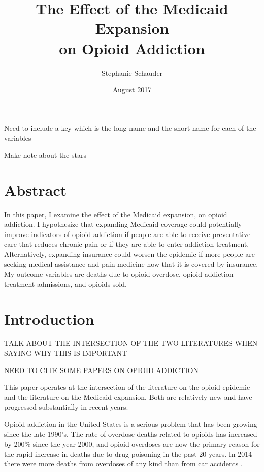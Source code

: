 \documentclass[11pt]{article}
\title{The Effect of the Medicaid Expansion \\ on Opioid Addiction}
\author{Stephanie Schauder}
\date{August 2017}
\begin{document}
\maketitle



Need to include a key which is the long name and the short name for each of the variables 

Make note about the stars



\section{Abstract}

In this paper, I examine the effect of the Medicaid expansion, on opioid addiction.  I hypothesize that expanding Medicaid coverage could potentially improve indicators of opioid addiction if people are able to receive preventative care that reduces chronic pain or if they are able to enter addiction treatment.  Alternatively, expanding insurance could worsen the epidemic if more people are seeking medical assistance and pain medicine now that it is covered by insurance.  My outcome variables are deaths due to opioid overdose, opioid addiction treatment admissions, and opioids sold.

\section{Introduction} 

TALK ABOUT THE INTERSECTION OF THE TWO LITERATURES WHEN SAYING WHY THIS IS IMPORTANT

NEED TO CITE SOME PAPERS ON OPIOID ADDICTION

This paper operates at the intersection of the literature on the opioid epidemic and the literature on the Medicaid expansion.  Both are relatively new and have progressed substantially in recent years.  

Opioid addiction in the United States is a serious problem that has been growing since the late 1990's.  The rate of overdose deaths related to opioids has increased by 200$\%$ since the year 2000, and opioid overdoses are now the primary reason for the rapid increase in deaths due to drug poisoning in the past 20 years.  In 2014 there were more deaths from overdoses of any kind than from car accidents \citep{Rudd2016}.   
\end{document}
